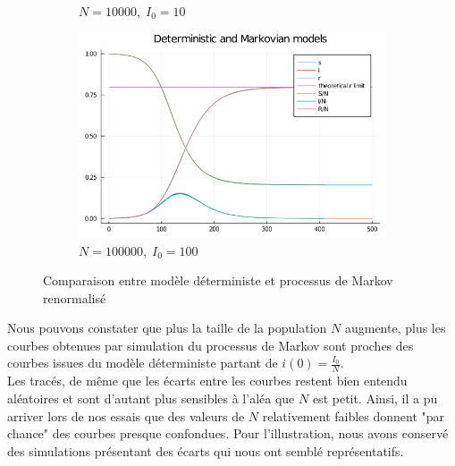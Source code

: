 \documentclass[12pt]{extarticle}
\begin{document}
\begin{figure}[h!]
\begin{subfigure}{.5\textwidth}
        \caption{$N = 10000, \; I_0 = 10$}
    \end{subfigure}
    \begin{subfigure}{.5\textwidth}
        \includegraphics[width=0.8\linewidth]{figures/figureN_100000_initialI_100.png}
        \caption{$N = 100000, \; I_0 = 100$}
    \end{subfigure}
    \caption{Comparaison entre modèle déterministe et processus de Markov renormalisé}
    \label{fig:convergence}
\end{figure}

Nous pouvons constater que plus la taille de la population $N$ augmente, plus les courbes obtenues par simulation du processus de Markov sont proches des courbes issues du modèle déterministe partant de $i(0) = \frac{I_0}{N}$.\\
Les tracés, de même que les écarts entre les courbes restent bien entendu aléatoires et sont d'autant plus sensibles à l'aléa que $N$ est petit.
Ainsi, il a pu arriver lors de nos essais que des valeurs de $N$ relativement faibles donnent "par chance" des courbes presque confondues.
Pour l'illustration, nous avons conservé des simulations présentant des écarts qui nous ont semblé représentatifs.
\end{document}
